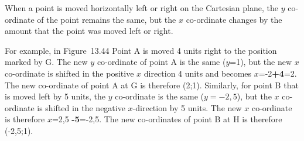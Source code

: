         \label{m39358*id70955}When a point is moved horizontally left or right on the Cartesian plane, the $y$ co-ordinate of the point remains the same, but the \begin{math}x\end{math} co-ordinate changes by the amount that the point was moved left or right.\par 
        \label{m39358*id70977}For example, in Figure~13.44 Point A is moved 4 units right to the position marked by G. The new $y$ co-ordinate of point A is the same (\begin{math}y\end{math}=1), but the new \begin{math}x\end{math} co-ordinate is shifted in the positive \begin{math}x\end{math} direction 4 units and becomes \begin{math}x\end{math}=-2\textbf{+4}=2. The new co-ordinate of point A at G is therefore (2;1). Similarly, for point B that is moved left by 5 units, the \begin{math}y\end{math} co-ordinate is the same (\begin{math}y=-2,5\end{math}), but the \begin{math}x\end{math} co-ordinate is shifted in the negative \begin{math}x\end{math}-direction by 5 units. The new \begin{math}x\end{math} co-ordinate is therefore \begin{math}x\end{math}=2,5 \textbf{-5}=-2,5. The new co-ordinates of point B at H is therefore (-2,5;1).\par 
        
    \setcounter{subfigure}{0}


